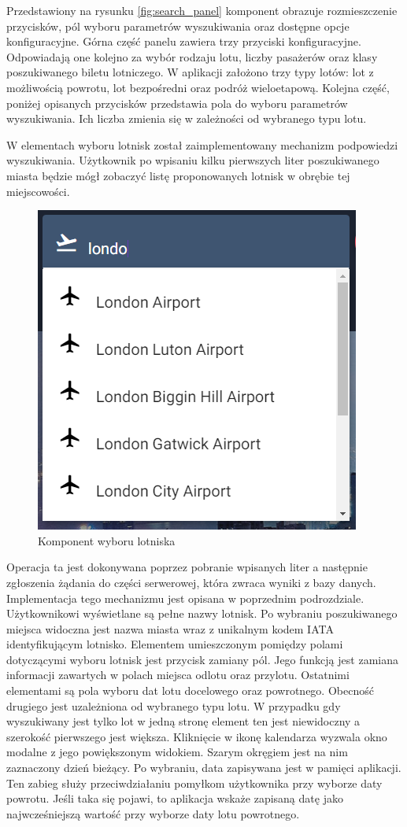 \documentclass[12pt, twoside]{report}
\begin{document}
Przedstawiony na rysunku \ref{fig:search_panel} komponent obrazuje rozmieszczenie przycisków, pól wyboru parametrów wyszukiwania oraz dostępne opcje konfiguracyjne. Górna część panelu zawiera trzy przyciski konfiguracyjne. Odpowiadają one kolejno za wybór rodzaju lotu, liczby pasażerów oraz klasy poszukiwanego biletu lotniczego. W aplikacji założono trzy typy lotów: lot z możliwością powrotu, lot bezpośredni oraz podróż wieloetapową. Kolejna część, poniżej opisanych przycisków przedstawia pola do wyboru parametrów wyszukiwania. Ich liczba zmienia się w zależności od wybranego typu lotu.

W elementach wyboru lotnisk został zaimplementowany mechanizm podpowiedzi wyszukiwania. Użytkownik po wpisaniu kilku pierwszych liter poszukiwanego miasta będzie mógł zobaczyć listę proponowanych lotnisk w obrębie tej miejscowości. 
\begin{figure}[!ht]
\centering
\includegraphics[scale=0.8, keepaspectratio]{airport_choose.png}
\caption{Komponent wyboru lotniska}
\label{fig:airport_choose}
\end{figure}
Operacja ta jest dokonywana poprzez pobranie wpisanych liter a następnie zgłoszenia żądania do części serwerowej, która zwraca wyniki z bazy danych. Implementacja tego mechanizmu jest opisana w poprzednim podrozdziale. Użytkownikowi wyświetlane są pełne nazwy lotnisk. Po wybraniu poszukiwanego miejsca widoczna jest nazwa miasta wraz z unikalnym kodem IATA identyfikującym lotnisko. Elementem umieszczonym pomiędzy polami dotyczącymi wyboru lotnisk jest przycisk zamiany pól. Jego funkcją jest zamiana informacji zawartych w polach miejsca odlotu oraz przylotu. Ostatnimi elementami są pola wyboru dat lotu docelowego oraz powrotnego. Obecność drugiego jest uzależniona od wybranego typu lotu. W przypadku gdy wyszukiwany jest tylko lot w jedną stronę element ten jest niewidoczny a szerokość pierwszego jest większa. Kliknięcie w ikonę kalendarza wyzwala okno modalne z jego powiększonym widokiem. Szarym okręgiem jest na nim zaznaczony dzień bieżący. Po wybraniu, data zapisywana jest w pamięci aplikacji. Ten zabieg służy przeciwdziałaniu pomyłkom użytkownika przy wyborze daty powrotu. Jeśli taka się pojawi, to aplikacja wskaże zapisaną datę jako najwcześniejszą wartość przy wyborze daty lotu powrotnego. 
\end{document}

